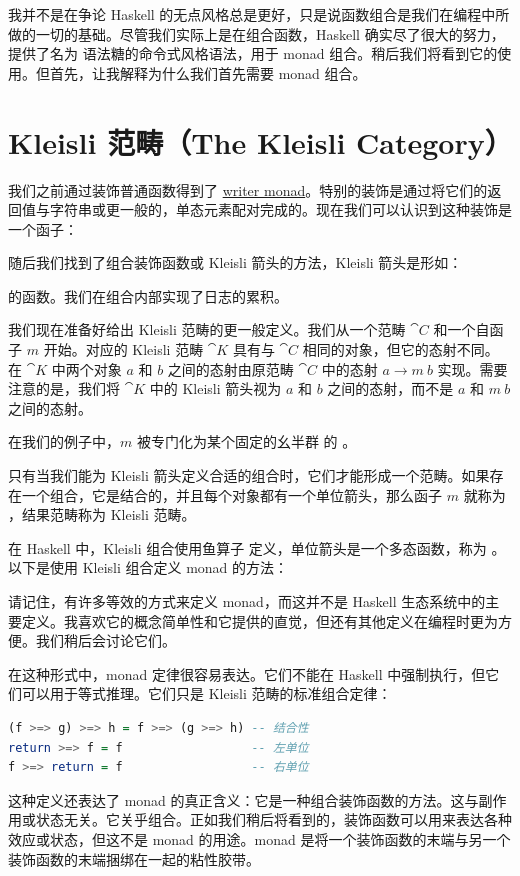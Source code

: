 我并不是在争论 Haskell 的无点风格总是更好，只是说函数组合是我们在编程中所做的一切的基础。尽管我们实际上是在组合函数，Haskell 确实尽了很大的努力，提供了名为  语法糖的命令式风格语法，用于 monad 组合。稍后我们将看到它的使用。但首先，让我解释为什么我们首先需要 monad 组合。

\section{Kleisli 范畴（The Kleisli Category）}

我们之前通过装饰普通函数得到了 \hyperref[kleisli-categories]{writer monad}。特别的装饰是通过将它们的返回值与字符串或更一般的，单态元素配对完成的。现在我们可以认识到这种装饰是一个函子：

随后我们找到了组合装饰函数或 Kleisli 箭头的方法，Kleisli 箭头是形如：

的函数。我们在组合内部实现了日志的累积。

我们现在准备好给出 Kleisli 范畴的更一般定义。我们从一个范畴 $\cat{C}$ 和一个自函子 $m$ 开始。对应的 Kleisli 范畴 $\cat{K}$ 具有与 $\cat{C}$ 相同的对象，但它的态射不同。在 $\cat{K}$ 中两个对象 $a$ 和 $b$ 之间的态射由原范畴 $\cat{C}$ 中的态射 $a \to m\ b$ 实现。需要注意的是，我们将 $\cat{K}$ 中的 Kleisli 箭头视为 $a$ 和 $b$ 之间的态射，而不是 $a$ 和 $m\ b$ 之间的态射。

在我们的例子中，$m$ 被专门化为某个固定的幺半群  的 。

只有当我们能为 Kleisli 箭头定义合适的组合时，它们才能形成一个范畴。如果存在一个组合，它是结合的，并且每个对象都有一个单位箭头，那么函子 $m$ 就称为 ，结果范畴称为 Kleisli 范畴。

在 Haskell 中，Kleisli 组合使用鱼算子 \code{>=>} 定义，单位箭头是一个多态函数，称为 。以下是使用 Kleisli 组合定义 monad 的方法：

请记住，有许多等效的方式来定义 monad，而这并不是 Haskell 生态系统中的主要定义。我喜欢它的概念简单性和它提供的直觉，但还有其他定义在编程时更为方便。我们稍后会讨论它们。

在这种形式中，monad 定律很容易表达。它们不能在 Haskell 中强制执行，但它们可以用于等式推理。它们只是 Kleisli 范畴的标准组合定律：

\begin{lstlisting}[language=Haskell]
(f >=> g) >=> h = f >=> (g >=> h) -- 结合性
return >=> f = f                  -- 左单位
f >=> return = f                  -- 右单位
\end{lstlisting}
这种定义还表达了 monad 的真正含义：它是一种组合装饰函数的方法。这与副作用或状态无关。它关乎组合。正如我们稍后将看到的，装饰函数可以用来表达各种效应或状态，但这不是 monad 的用途。monad 是将一个装饰函数的末端与另一个装饰函数的末端捆绑在一起的粘性胶带。

